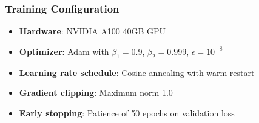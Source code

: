 \documentclass[11pt,twocolumn]{article}
\begin{document}
\subsubsection{Training Configuration}
\begin{itemize}
    \item \textbf{Hardware}: NVIDIA A100 40GB GPU
    \item \textbf{Optimizer}: Adam with $\beta_1=0.9$, $\beta_2=0.999$, $\epsilon=10^{-8}$
    \item \textbf{Learning rate schedule}: Cosine annealing with warm restart
    \item \textbf{Gradient clipping}: Maximum norm 1.0
    \item \textbf{Early stopping}: Patience of 50 epochs on validation loss
\end{itemize}



\end{document}
